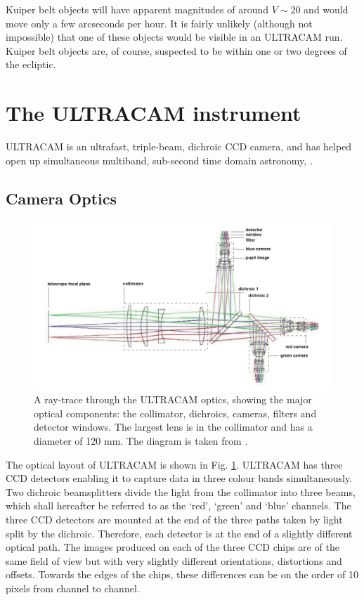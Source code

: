Kuiper belt objects will have apparent magnitudes of around $V\sim 20$ and would move only a few arcseconds per hour. It is fairly unlikely (although not impossible) that one of these objects would be visible in an ULTRACAM run. Kuiper belt objects are, of course, suspected to be within one or two degrees of the ecliptic. 

\section{The ULTRACAM instrument} 
ULTRACAM is an ultrafast, triple-beam, dichroic CCD camera, and has helped open up simultaneous multiband, sub-second time domain astronomy, \citep{dhillon07}. 

\subsection{Camera Optics}

\begin{figure}
\centering
\includegraphics[width=120mm]{images/ucamoptics.png}
\caption{A ray-trace through the ULTRACAM optics, showing the major optical components: the collimator, dichroics, cameras, filters and detector windows. The largest lens is in the collimator and has a diameter of 120 mm. The diagram is taken from \citet{dhillon07}.}
\label{fig:optics}
\end{figure}

The optical layout of ULTRACAM is shown in Fig. \ref{fig:optics}. ULTRACAM has three CCD detectors enabling it to capture data in three colour bands simultaneously. Two dichroic beamsplitters divide the light from the collimator into three beams, which shall hereafter be referred to as the `red', `green' and `blue' channels. The three CCD detectors are mounted at the end of the three paths taken by light split by the dichroic. Therefore, each detector is at the end of a slightly different optical path. The images produced on each of the three CCD chips are of the same field of view but with very slightly different orientations, distortions and offsets. Towards the edges of the chips, these differences can be on the order of 10 pixels from channel to channel. 

